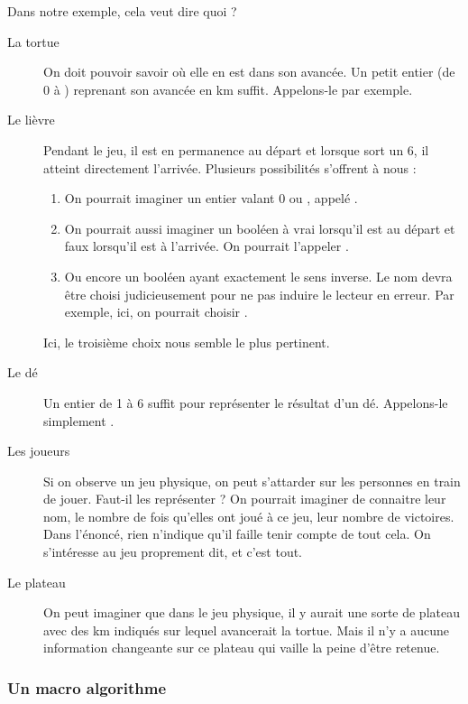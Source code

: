 			Dans notre exemple, cela veut dire quoi ?
			\begin{description}
			\item[La tortue]
				On doit pouvoir savoir où elle en est dans son avancée.
				Un petit entier (de 0 à \nbMaxKmTortue{}) reprenant son avancée en km suffit.
				Appelons-le  par exemple.
			\item[Le lièvre]
				Pendant le jeu, il est en permanence au départ
				et lorsque sort un 6, il atteint directement l'arrivée.
				Plusieurs possibilités s'offrent à nous :		
				\begin{enumerate}
				\item
					On pourrait imaginer un entier valant 0 ou \nbMaxKmTortue{},
					appelé .
				\item
					On pourrait aussi imaginer un booléen à vrai 
					lorsqu'il est au départ et faux lorsqu'il est à l'arrivée.
					On pourrait l'appeler .
				\item
					Ou encore un booléen ayant exactement le sens inverse.
					Le nom devra être choisi judicieusement pour ne pas induire
					le lecteur en erreur.
					Par exemple, ici, on pourrait choisir .
				\end{enumerate}
				
				Ici, le troisième choix nous semble le plus pertinent.
			\item[Le dé]
				Un entier de 1 à 6 suffit pour représenter le résultat d'un dé.
				Appelons-le simplement .
			\item[Les joueurs]
				Si on observe un jeu physique,
				on peut s'attarder sur les personnes en train de jouer.
				Faut-il les représenter ?
				On pourrait imaginer de connaitre leur nom,
				le nombre de fois qu'elles ont joué à ce jeu,
				leur nombre de victoires.
				Dans l'énoncé, 
				rien n'indique qu'il faille tenir compte de tout cela. 
				On s'intéresse au jeu proprement dit, et c'est tout.
			\item[Le plateau]
				On peut imaginer que dans le jeu physique,
				il y aurait une sorte de plateau 
				avec des km indiqués
				sur lequel avancerait la tortue.
				Mais il n'y a aucune information changeante
				sur ce plateau qui vaille la peine d'être retenue.
			\end{description}

		\subsubsection*{Un macro algorithme}
				
